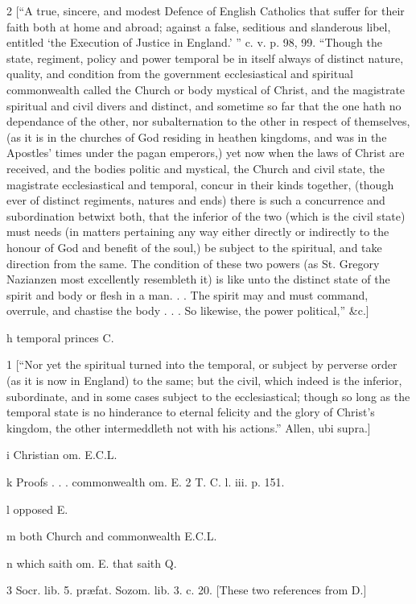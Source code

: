 2
[“A true, sincere, and modest Defence of English Catholics that suffer for their faith both at home and abroad; against a false, seditious and slanderous libel, entitled ‘the Execution of Justice in England.’ ” c. v. p. 98, 99. “Though the state, regiment, policy and power temporal be in itself always of distinct nature, quality, and condition from the government ecclesiastical and spiritual commonwealth called the Church or body mystical of Christ, and the magistrate spiritual and civil divers and distinct, and sometime so far that the one hath no dependance of the other, nor subalternation to the other in respect of themselves, (as it is in the churches of God residing in heathen kingdoms, and was in the Apostles’ times under the pagan emperors,) yet now when the laws of Christ are received, and the bodies politic and mystical, the Church and civil state, the magistrate ecclesiastical and temporal, concur in their kinds together, (though ever of distinct regiments, natures and ends) there is such a concurrence and subordination betwixt both, that the inferior of the two (which is the civil state) must needs (in matters pertaining any way either directly or indirectly to the honour of God and benefit of the soul,) be subject to the spiritual, and take direction from the same. The condition of these two powers (as St. Gregory Nazianzen most excellently resembleth it) is like unto the distinct state of the spirit and body or flesh in a man. . . The spirit may and must command, overrule, and chastise the body . . . So likewise, the power political,” &c.]

h
temporal princes C.

1
[“Nor yet the spiritual turned into the temporal, or subject by perverse order (as it is now in England) to the same; but the civil, which indeed is the inferior, subordinate, and in some cases subject to the ecclesiastical; though so long as the temporal state is no hinderance to eternal felicity and the glory of Christ’s kingdom, the other intermeddleth not with his actions.” Allen, ubi supra.]

i
Christian om. E.C.L.

k Proofs . . . commonwealth om. E.
2
T. C. l. iii. p. 151.

l
opposed E.

m
both Church and commonwealth E.C.L.

n
which saith om. E. that saith Q.

3
Socr. lib. 5. præfat. Sozom. lib. 3. c. 20. [These two references from D.]

